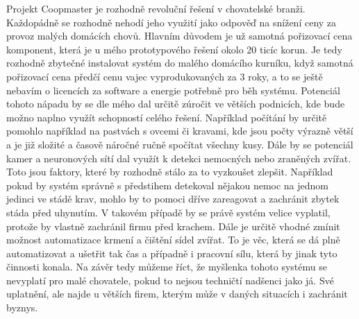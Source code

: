 Projekt Coopmaster je rozhodně revoluční řešení v chovatelské branži.
Každopádně se rozhodně nehodí jeho využití jako odpověď na snížení ceny za provoz malých domácích chovů.
Hlavním důvodem je už samotná pořizovací cena komponent, která je u mého prototypového řešení okolo 20 ticíc korun.
Je tedy rozhodně zbytečné instalovat systém do malého domácího kurníku, když samotná pořizovací cena předčí cenu vajec vyprodukovaných za 3 roky, a to se ještě nebavím o licencích za software a energie potřebně pro běh systému.\newline
Potenciál tohoto nápadu by se dle mého dal určitě zúročit ve větších podnicích, kde bude možno naplno využít schopností celého řešení.
Například počítání by určitě pomohlo například na pastvách s ovcemi či kravami, kde jsou počty výrazně větší a je již složité a časově náročné ručně spočítat všechny kusy.
Dále by se potenciál kamer a neuronových sítí dal využít k detekci nemocných nebo zraněných zvířat.
Toto jsou faktory, které by rozhodně stálo za to vyzkoušet zlepšit.
Například pokud by systém správně s předstihem detekoval nějakou nemoc na jednom jedinci ve stádě krav, mohlo by to pomoci dříve zareagovat a zachránit zbytek stáda před uhynutím.
V takovém případě by se právě systém velice vyplatil, protože by vlastně zachránil firmu před krachem.\newline
Dále je určitě vhodné zmínit možnost automatizace krmení a čištění sídel zvířat.
To je věc, která se dá plně automatizovat a ušetřit tak čas a případně i pracovní sílu, která by jinak tyto činnosti konala.\newline
Na závěr tedy můžeme říct, že myšlenka tohoto systému se nevyplatí pro malé chovatele, pokud to nejsou techničtí nadšenci jako já.
Své uplatnění, ale najde u větších firem, kterým může v daných situacích i zachránit byznys.



